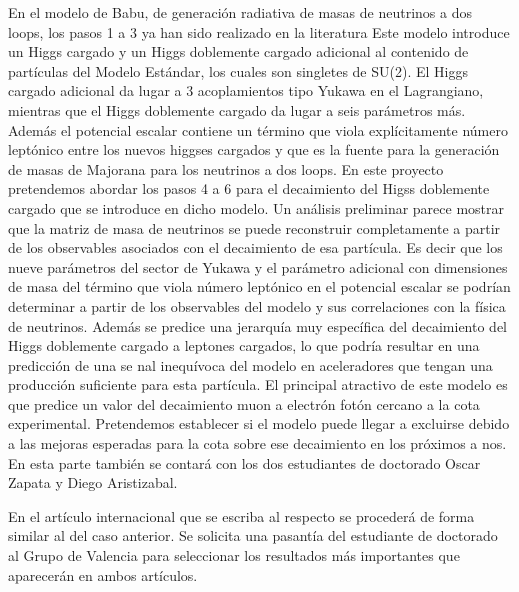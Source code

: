 En el modelo de Babu, de generación radiativa de masas de neutrinos a
dos loops, los pasos 1 a 3 ya han sido realizado en la
literatura %
Este modelo introduce un Higgs cargado
y un Higgs doblemente cargado adicional al contenido de partículas del
Modelo Estándar, los cuales son singletes de SU(2). El Higgs cargado
adicional da lugar a 3 acoplamientos tipo Yukawa en el Lagrangiano,
mientras que el Higgs doblemente cargado da lugar a seis parámetros
más. Además el potencial escalar contiene un término que viola
explícitamente número leptónico entre los nuevos higgses cargados y
que es la fuente para la generación de masas de Majorana para los
neutrinos a dos loops. En este proyecto pretendemos abordar los pasos
4 a 6 para el decaimiento del Higss doblemente cargado que se
introduce en dicho modelo. Un análisis preliminar parece mostrar que
la matriz de masa de neutrinos se puede reconstruir completamente a
partir de los observables asociados con el decaimiento de esa
partícula. Es decir que los nueve parámetros del sector de Yukawa y el
parámetro adicional con dimensiones de masa del término que viola
número leptónico en el potencial escalar se podrían determinar a
partir de los observables del modelo y sus correlaciones con la física
de neutrinos. Además se predice una jerarquía muy específica del
decaimiento del Higgs doblemente cargado a leptones cargados, lo que
podría resultar en una predicción de una se nal inequívoca del modelo
en aceleradores que tengan una producción suficiente para esta
partícula. El principal atractivo de este modelo es que predice un
valor del decaimiento muon a electrón fotón cercano a la cota
experimental. Pretendemos establecer si el modelo puede llegar a
excluirse debido a las mejoras esperadas para la cota sobre ese
decaimiento en los próximos a nos. En esta parte también se contará con
los dos estudiantes de doctorado Oscar Zapata y Diego Aristizabal.

En el artículo internacional que se escriba al respecto se procederá
de forma similar al del caso anterior. Se solicita una pasantía del
estudiante de doctorado al Grupo de Valencia para seleccionar los
resultados más importantes que aparecerán en ambos artículos.

